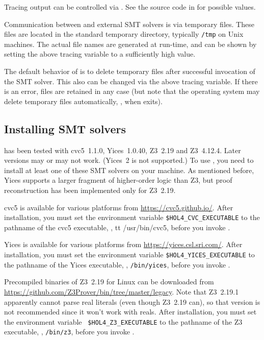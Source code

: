 Tracing output can be controlled via .  See the source code in  for
possible values.

Communication between \HOL{} and external SMT solvers is via temporary
files.  These files are located in the standard temporary directory,
typically {\tt /tmp} on Unix machines.  The actual file names are
generated at run-time, and can be shown by setting the above tracing
variable to a sufficiently high value.

The default behavior of  is to delete temporary files
after successful invocation of the SMT solver.  This also can be
changed via the above tracing variable.  If there is an error, files
are retained in any case (but note that the operating system may
delete temporary files automatically, \eg, when \HOL{} exits).

\subsection{Installing SMT solvers}

 has been tested with cvc5~1.1.0, Yices~1.0.40, Z3~2.19
and Z3~4.12.4. Later versions may or may not work.  (Yices~2 is not
supported.)  To use , you need to install at least one
of these SMT solvers on your machine.  As mentioned before, Yices
supports a larger fragment of higher-order logic than Z3, but proof
reconstruction has been implemented only for Z3~2.19.

cvc5 is available for various platforms from
\url{https://cvc5.github.io/}. After installation, you must set the
environment variable {\tt \$HOL4\_CVC\_EXECUTABLE} to the pathname of
the cvc5 executable, \eg, {tt /usr/bin/cvc5}, before you invoke \HOL.

Yices is available for various platforms from
\url{https://yices.csl.sri.com/}.  After installation, you must set
the environment variable {\tt \$HOL4\_YICES\_EXECUTABLE} to the
pathname of the Yices executable, \eg, {\tt /bin/yices}, before you
invoke \HOL.

Precompiled binaries of Z3~2.19 for Linux can be downloaded from
\url{https://github.com/Z3Prover/bin/tree/master/legacy}. Note that
Z3~2.19.1 apparently cannot parse real literals (even though Z3~2.19
can), so that version is not recommended since it won't work with
reals. After installation, you must set the environment variable {\tt
\$HOL4\_Z3\_EXECUTABLE} to the pathname of the Z3 executable, \eg,
{\tt /bin/z3}, before you invoke \HOL.

